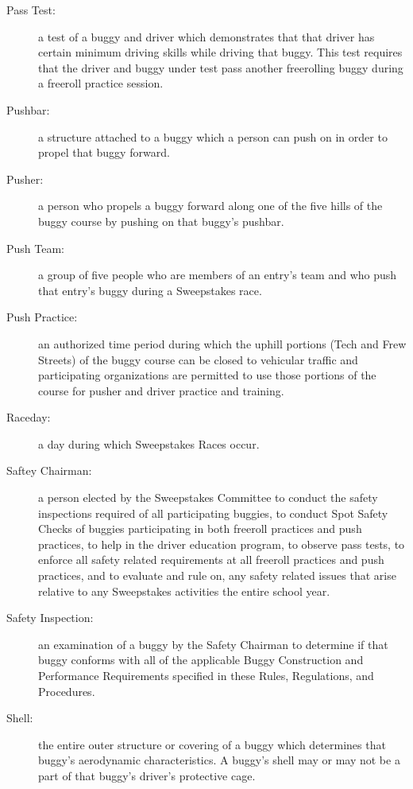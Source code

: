 \begin{description}
	\item[Pass Test:]
	a test of a buggy and driver which demonstrates that that driver has certain minimum driving skills while driving that buggy. This test requires that the driver and buggy under test pass another freerolling buggy during a freeroll practice session.

	\item[Pushbar:]
	a structure attached to a buggy which a person can push on in order to propel that buggy forward. 

	\item[Pusher:]
	a person who propels a buggy forward along one of the five hills of the buggy course by pushing on that buggy's pushbar.

	\item[Push Team:]
	a group of five people who are members of an entry's team and who push that entry's buggy during a Sweepstakes race.

	\item[Push Practice:]
	an authorized time period during which the uphill portions (Tech and Frew Streets) of the buggy course can be closed to vehicular traffic and participating organizations are permitted to use those portions of the course for pusher and driver practice and training.

	\item[Raceday:]
	a day during which Sweepstakes Races occur.

	\item[Saftey Chairman:]
	a person elected by the Sweepstakes Committee to conduct the safety inspections required of all participating buggies, to conduct Spot Safety Checks of buggies participating in both freeroll practices and push practices, to help in the driver education program, to observe pass tests, to enforce all safety related requirements at all freeroll practices and push practices, and to evaluate and rule on, any safety related issues that arise relative to any Sweepstakes activities the entire school year.

	\item[Safety Inspection:]
	an examination of a buggy by the Safety Chairman to determine if that buggy conforms with all of the applicable Buggy Construction and Performance Requirements specified in these Rules, Regulations, and Procedures.

	\item[Shell:]
	the entire outer structure or covering of a buggy which determines that buggy's aerodynamic characteristics. A buggy's shell may or may not be a part of that buggy's driver's protective cage.


\end{description}
